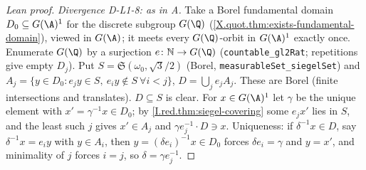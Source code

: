\begin{proof}[Lean proof]
\emph{Divergence D-L1-8: as in A.} Take a Borel fundamental domain $D_0\subseteq G(\A)^1$ for the discrete subgroup $G(\Q)$ (\cref{X.quot.thm:exists-fundamental-domain}), viewed in $G(\A)$; it meets every $G(\Q)$-orbit in $G(\A)^1$ exactly once. Enumerate $G(\Q)$ by a surjection $e\colon\mathbb N\to G(\Q)$ (\texttt{countable\_gl2Rat}; repetitions give empty $D_j$). Put $S=\mathfrak S(\omega_0,\sqrt3/2)$ (Borel, \texttt{measurableSet\_siegelSet}) and $A_j=\{y\in D_0:e_jy\in S,\ e_iy\notin S\ \forall i<j\}$, $D=\bigcup_je_jA_j$. These are Borel (finite intersections and translates). $D\subseteq S$ is clear. For $x\in G(\A)^1$ let $\gamma$ be the unique element with $x'=\gamma^{-1}x\in D_0$; by \cref{I.red.thm:siegel-covering} some $e_jx'$ lies in $S$, and the least such $j$ gives $x'\in A_j$ and $\gamma e_j^{-1}\cdot D\ni x$. Uniqueness: if $\delta^{-1}x\in D$, say $\delta^{-1}x=e_iy$ with $y\in A_i$, then $y=(\delta e_i)^{-1}x\in D_0$ forces $\delta e_i=\gamma$ and $y=x'$, and minimality of $j$ forces $i=j$, so $\delta=\gamma e_j^{-1}$.
\end{proof}

